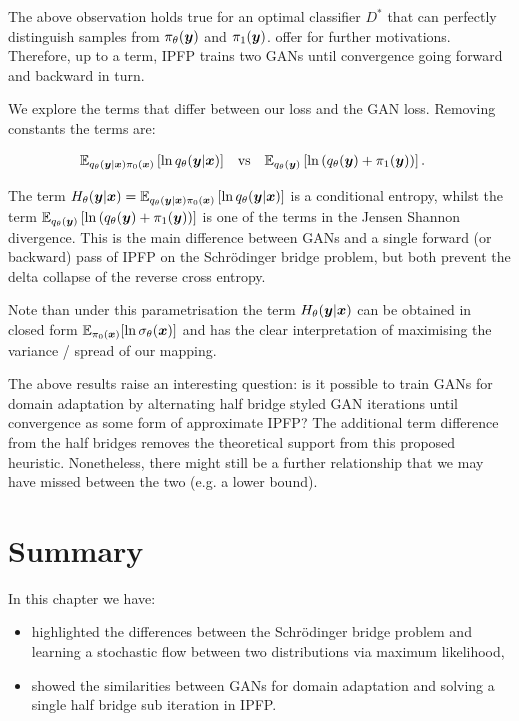 \documentclass[a4paper,12pt,twoside,openright]{report}
\theoremstyle{definition}
\begin{document}
The above observation holds true for an optimal classifier $D^{*}$ that can perfectly distinguish samples from $\pi_\theta({\bm{y}})$ and $\pi_1({\bm{y}})$. \cite{mohamed2016learning} offer for further motivations. Therefore, up to a term, IPFP trains two GANs until convergence going forward and backward in turn.

We explore the terms that differ between our loss and the GAN loss. Removing constants the terms are:

\begin{align}
 \mathbb{E}_{q_{\theta}({\bm{y}}|{\bm{x}})\pi_0({\bm{x}})}\left[ \operatorname{ln} q_{\theta}({\bm{y}}|{\bm{x}}) \right]\quad &\text{vs} \quad  \mathbb{E}_{q_{\theta}({\bm{y}})}\left[\operatorname{ln}\left(q_{\theta}({\bm{y}}) + \pi_1({\bm{y}})\right)\right].
\end{align}

The term $H_{\theta}({\bm{y}}|{\bm{x}}) =\mathbb{E}_{q_{\theta}({\bm{y}}|{\bm{x}})\pi_0({\bm{x}})}\left[ \operatorname{ln} q_{\theta}({\bm{y}}|{\bm{x}}) \right]$ is a conditional entropy, whilst the term $\mathbb{E}_{q_{\theta}({\bm{y}})}\left[\operatorname{ln}\left(q_{\theta}({\bm{y}}) + \pi_1({\bm{y}})\right)\right]$ is one of the terms in the Jensen Shannon divergence. This is the main difference between GANs and a single forward (or backward) pass of IPFP on the Schrödinger bridge problem, but both prevent the delta collapse of the reverse cross entropy.

Note than under this parametrisation the term $H_{\theta}({\bm{y}}|{\bm{x}})$ can be obtained in closed form $\mathbb{E}_{\pi_0({\bm{x}})}[\operatorname{ln} {\sigma}_{\theta}({\bm{x}})]$ and has the clear interpretation of maximising the variance / spread of our mapping.
 
The above results raise an interesting question: is it possible to train GANs for domain adaptation by alternating  half bridge styled GAN iterations until convergence as some form of approximate IPFP? The additional term difference from the half bridges removes the theoretical support from this proposed heuristic. Nonetheless, there might still be a further relationship that we may have missed between the two (e.g. a lower bound).

\section{Summary}

In this chapter we have:

\begin{itemize}
    \item highlighted the differences between the Schrödinger bridge problem and learning a stochastic flow between two distributions via maximum likelihood,
    \item showed the similarities between GANs for domain adaptation and solving a single half bridge sub iteration in IPFP.
\end{itemize}
\end{document}
